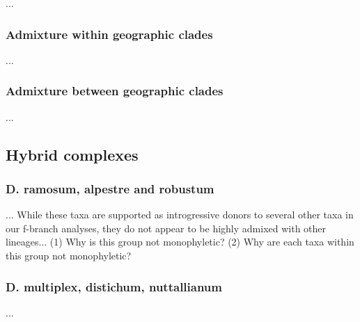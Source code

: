 \documentclass[11pt]{article}
\begin{document}
...


\subsubsection{Admixture within geographic clades}
...


\subsubsection{Admixture between geographic clades}
...





\subsection{Hybrid complexes}

\subsubsection{D. ramosum, alpestre and robustum}
...
While these taxa are supported as introgressive donors to several other taxa in 
our f-branch analyses, they do not appear to be highly admixed with other 
lineages...
(1) Why is this group not monophyletic?
(2) Why are each taxa within this group not monophyletic?


\subsubsection{D. multiplex, distichum, nuttallianum}
...
\end{document}
